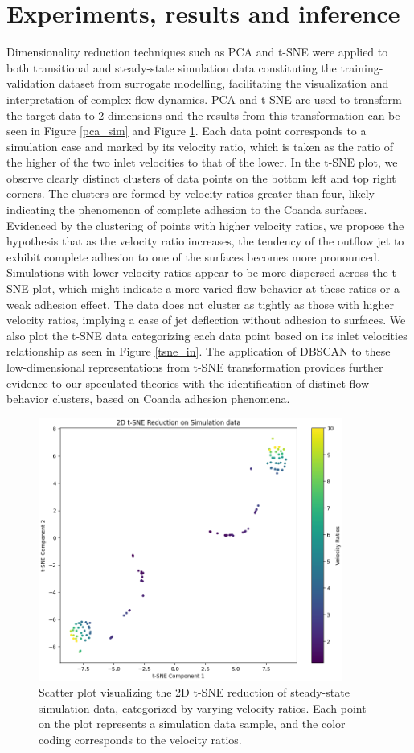 \section{Experiments, results and inference}
Dimensionality reduction techniques such as PCA and t-SNE were applied to both transitional and steady-state simulation data constituting the training-validation dataset from surrogate modelling, facilitating the visualization and interpretation of complex flow dynamics. PCA and t-SNE are used to transform the target data to 2 dimensions and the results from this transformation can be seen in Figure \ref{pca_sim} and Figure \ref{tsne_sim}. Each data point corresponds to a simulation case and marked by its velocity ratio, which is taken as the ratio of the higher of the two inlet velocities to that of the lower. In the t-SNE plot, we observe clearly distinct clusters of data points on the bottom left and top right corners. The clusters are formed by velocity ratios greater than four, likely indicating the phenomenon of complete adhesion to the Coanda surfaces.\\
Evidenced by the clustering of points with higher velocity ratios, we propose the hypothesis that as the velocity ratio increases, the tendency of the outflow jet to exhibit complete adhesion to one of the surfaces becomes more pronounced. Simulations with lower velocity ratios appear to be more dispersed across the t-SNE plot, which might indicate a more varied flow behavior at these ratios or a weak adhesion effect. The data does not cluster as tightly as those with higher velocity ratios, implying a case of jet deflection without adhesion to surfaces. We also plot the t-SNE data categorizing each data point based on its inlet velocities relationship as seen in Figure \ref{tsne_in}. The application of DBSCAN to these low-dimensional representations from t-SNE transformation provides further evidence to our speculated theories with the identification of distinct flow behavior clusters, based on Coanda adhesion phenomena. 
\begin{figure}[ht]
    \centering
    \includegraphics[width=10cm]{images/Clustering/tsne_sim_cmap.png}
    \caption{Scatter plot visualizing the 2D t-SNE reduction of steady-state simulation data, categorized by varying velocity ratios. Each point on the plot represents a simulation data sample, and the color coding corresponds to the velocity ratios. }
    \label{tsne_sim}
    \end{figure}
